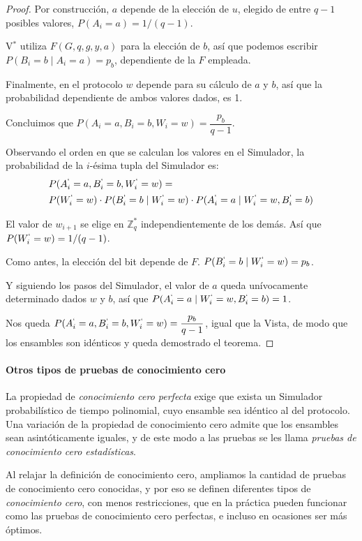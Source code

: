 \begin{proof}
	Por construcción, $a$ depende de la elección de $u$, elegido de entre $q-1$ posibles valores, $P(A_i = a) = 1/(q-1)$.
	
	V$^*$ utiliza $F(G,q,g,y,a)$ para la elección de $b$, así que podemos escribir $P(B_i = b \mid A_i = a) = p_b$, dependiente de la $F$ empleada.
	
	Finalmente, en el protocolo $w$ depende para su cálculo de $a$ y $b$, así que la probabilidad dependiente de ambos valores dados, es 1.
	
	Concluimos que $P(A_i=a, B_i=b, W_i = w) = \dfrac{p_b}{q-1}$.
	
	
	Observando el orden en que se calculan los valores en el Simulador, la probabilidad de la $i$-ésima tupla del Simulador es:
	\begin{align*}
	& P(A_i^`=a, B_i^`=b, W_i^` = w) = \\
	& P(W_i^` = w) \cdot P(B_i^` = b \mid W_i^` = w) \cdot P(A_i^` = a \mid W_i^` = w, B_i^`=b)
	\end{align*}
	
	El valor de $w_{i+1}$ se elige en $\mathbb{Z}_q^*$ independientemente de los demás. Así que $P(W_i^` = w) =  1/(q-1)$.
	
	Como antes, la elección del bit depende de $F$. $  P(B_i^` = b \mid W_i^` = w) = p_b $.
	
	Y siguiendo los pasos del Simulador, el valor de $a$ queda unívocamente determinado dados $w$ y $b$, así que $P(A_i^` = a \mid W_i^` = w, B_i^`=b) = 1$.
	
	Nos queda $ P(A_i^`=a, B_i^`=b, W_i^` = w) = \dfrac{p_b}{q-1}$, igual que la Vista, de modo que los ensambles son idénticos y queda demostrado el teorema.
	
\end{proof}


\hfil

\paragraph{Otros tipos de pruebas de conocimiento cero}

La propiedad de \textit{conocimiento cero perfecta} exige que exista un Simulador probabilístico de tiempo polinomial, cuyo ensamble sea idéntico al del protocolo. Una variación de la propiedad de conocimiento cero admite que los ensambles sean asintóticamente iguales, y de este modo a las pruebas se les llama \textit{pruebas de conocimiento cero estadísticas}.

Al relajar la definición de conocimiento cero, ampliamos la cantidad de pruebas de conocimiento cero conocidas, y por eso se definen diferentes tipos de \textit{conocimiento cero}, con menos restricciones, que en la práctica pueden funcionar como las pruebas de conocimiento cero perfectas, e incluso en ocasiones ser más óptimos.



